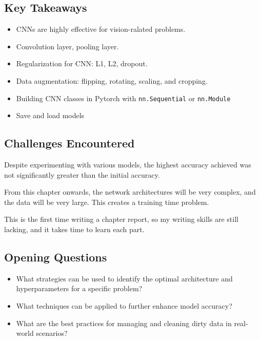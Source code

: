 \subsection{Key Takeaways}
\begin{itemize}
    \item CNNs are highly effective for vision-ralated problems.
    \item Convolution layer, pooling layer.
    \item Regularization for CNN: L1, L2, dropout.
    \item Data augmentation: flipping, rotating, scaling, and cropping.
    \item Building CNN classes in Pytorch with \texttt{nn.Sequential} or \texttt{nn.Module}
    \item Save and load models
\end{itemize}

\subsection{Challenges Encountered}

Despite experimenting with various models, the highest accuracy achieved was not significantly greater than the initial accuracy.

From this chapter onwards, the network architectures will be very complex, and the data will be very large. This creates a training time problem.

This is the first time writing a chapter report, so my writing skills are still lacking, and it takes time to learn each part.

\subsection{Opening Questions}
\begin{itemize}
    \item What strategies can be used to identify the optimal architecture and hyperparameters for a specific problem?
    \item What techniques can be applied to further enhance model accuracy?
    \item What are the best practices for managing and cleaning dirty data in real-world scenarios?
\end{itemize}


